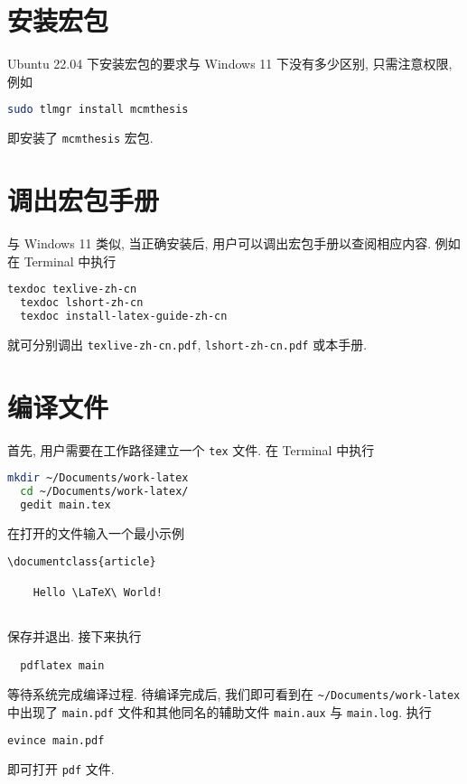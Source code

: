 \section{安装宏包}\label{sec:ubuntu:installpackage}

Ubuntu 22.04 下安装宏包的要求与 Windows 11 下没有多少区别, 只需注意权限, 例如
\begin{lstlisting}[language = bash]
  sudo tlmgr install mcmthesis
\end{lstlisting}
即安装了 \texttt{mcmthesis} 宏包.

\section{调出宏包手册}\label{sec:ubuntu:texdoc}

与 Windows 11 类似,
当正确安装后,
用户可以调出宏包手册以查阅相应内容.
例如在 \textsf{Terminal} 中执行
\begin{lstlisting}[language=bash]
  texdoc texlive-zh-cn
  texdoc lshort-zh-cn
  texdoc install-latex-guide-zh-cn
\end{lstlisting}
就可分别调出 \texttt{texlive-zh-cn.pdf},
\texttt{lshort-zh-cn.pdf}
或本手册.

\section{编译文件}

首先, 用户需要在工作路径建立一个 \texttt{tex} 文件.
在 \textsf{Terminal} 中执行
\begin{lstlisting}[language = bash]
  mkdir ~/Documents/work-latex
  cd ~/Documents/work-latex/
  gedit main.tex
\end{lstlisting}
在打开的文件输入一个最小示例
\begin{lstlisting}[language = {[LaTeX]TeX}]
  \documentclass{article}
  
    Hello \LaTeX\ World!
  
\end{lstlisting}
保存并退出. 
接下来执行
\begin{lstlisting}
  pdflatex main
\end{lstlisting}
等待系统完成编译过程. 
待编译完成后,
我们即可看到在 \texttt{\~{}/Documents/work-latex} 中出现了
\texttt{main.pdf} 文件和其他同名的辅助文件 \texttt{main.aux} 与
\texttt{main.log}. 
执行
\begin{lstlisting}[language=bash]
  evince main.pdf
\end{lstlisting}
即可打开 \texttt{pdf} 文件.

